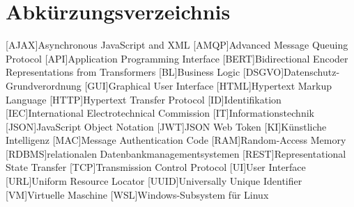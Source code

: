 \section{Abkürzungsverzeichnis}
\begin{acronym}
	[AJAX]{Asynchronous JavaScript and XML}
	[AMQP]{Advanced Message Queuing Protocol}
	[API]{Application Programming Interface}
	[BERT]{Bidirectional Encoder Representations from Transformers}
	[BL]{Business Logic}
	[DSGVO]{Datenschutz-Grundverordnung}
	[GUI]{Graphical User Interface}
	[HTML]{Hypertext Markup Language}
	[HTTP]{Hypertext Transfer Protocol}
	[ID]{Identifikation}
	[IEC]{International Electrotechnical Commission}
	[IT]{Informationstechnik}
	[JSON]{JavaScript Object Notation}
	[JWT]{JSON Web Token}
	[KI]{Künstliche Intelligenz}
	[MAC]{Message Authentication Code}
	[RAM]{Random-Access Memory}
	[RDBMS]{relationalen Datenbankmanagementsystemen}
	[REST]{Representational State Transfer}
	[TCP]{Transmission Control Protocol}
	[UI]{User Interface}
	[URL]{Uniform Resource Locator}
	[UUID]{Universally Unique Identifier}
	[VM]{Virtuelle Maschine}
	[WSL]{Windows-Subsystem für Linux}
	
\end{acronym}
